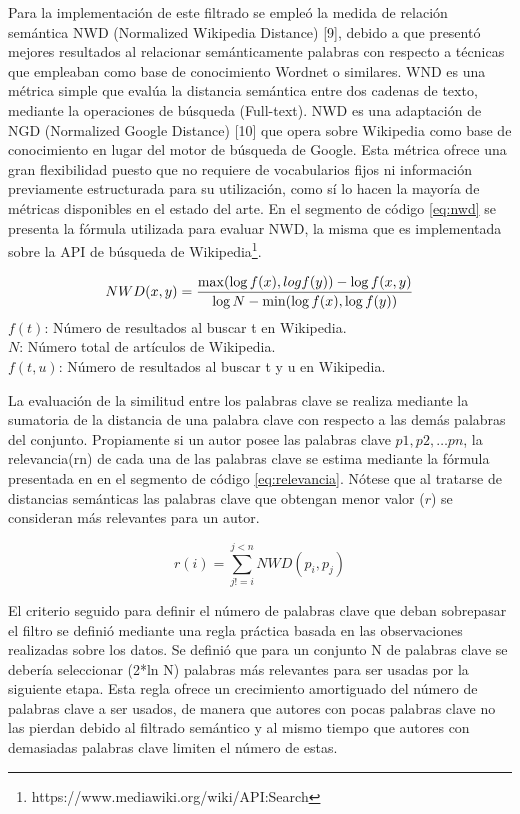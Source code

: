 \documentclass[conference]{IEEEtran}
\begin{document}
Para la implementación de este filtrado se empleó la medida de relación semántica NWD (Normalized Wikipedia Distance) [9], debido a que presentó mejores resultados al relacionar semánticamente palabras con respecto a técnicas que empleaban como base de conocimiento Wordnet o similares. WND es una métrica simple que evalúa la distancia semántica entre dos cadenas de texto, mediante la operaciones de búsqueda (Full-text). NWD es una adaptación de NGD (Normalized Google Distance) [10] que opera sobre Wikipedia como base de conocimiento en lugar del motor de búsqueda de Google. Esta métrica ofrece una gran flexibilidad puesto que no requiere de vocabularios fijos ni información previamente estructurada para su utilización, como sí lo hacen la mayoría de métricas disponibles en el estado del arte. En el segmento de código \ref{eq:nwd} se presenta la fórmula utilizada para evaluar NWD, la misma que es implementada sobre la API de búsqueda de Wikipedia\footnote{https://www.mediawiki.org/wiki/API:Search}.

\begin{equation} \label{eq:nwd}
NWD(x,y)  = \frac{\max(\log{f(x)},log{f(y)})-\log{f(x,y)}}{\log{N}-\min(\log{f(x)},\log{f(y)})} \\
\end{equation}
$f(t)$: Número de resultados al buscar t en Wikipedia.\\
$N$: Número total de artículos de Wikipedia.\\
$f(t,u)$: Número de resultados al buscar t y u en Wikipedia.


La evaluación de la similitud entre los palabras clave se realiza mediante la sumatoria de la distancia de una palabra clave con respecto a las demás palabras del conjunto. Propiamente si un autor posee las palabras clave $p1, p2, … pn$, la relevancia(rn) de cada una de las palabras clave se estima mediante la fórmula presentada en en el segmento de código \ref{eq:relevancia}. Nótese que al tratarse de distancias semánticas las palabras clave que obtengan menor valor ($r$) se consideran más relevantes para un autor.

\begin{equation}\label{eq:relevancia}
r(i) = \sum_{j!=i}^{j<n} NWD(p_i, p_j)
\end{equation}

El criterio seguido para definir el número de palabras clave que deban sobrepasar el filtro se definió mediante una regla práctica basada en las observaciones realizadas sobre los datos. Se definió que para un conjunto N de palabras clave se debería seleccionar (2*ln N) palabras más relevantes para ser usadas por la siguiente etapa. Esta regla ofrece un crecimiento amortiguado del número de palabras clave a ser usados, de manera que autores con pocas palabras clave no las pierdan debido al filtrado semántico y al mismo tiempo que autores con demasiadas palabras clave limiten el número de estas.
\end{document}
